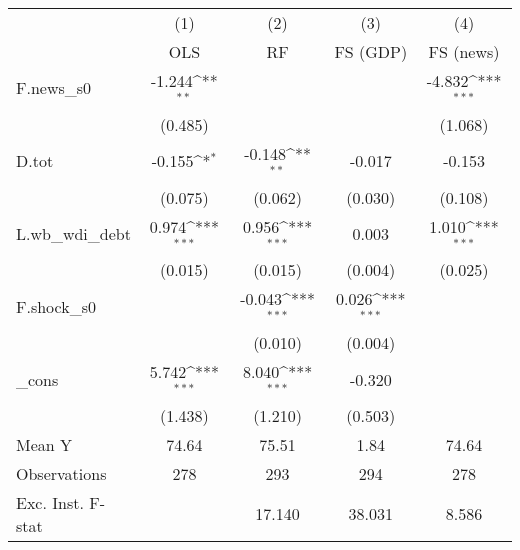 {
\def\sym#1{\ifmmode^{#1}\else\(^{#1}\)\fi}
\begin{tabular}{l*{4}{c}}
\toprule
            &\multicolumn{1}{c}{(1)}&\multicolumn{1}{c}{(2)}&\multicolumn{1}{c}{(3)}&\multicolumn{1}{c}{(4)}\\
            &\multicolumn{1}{c}{OLS}&\multicolumn{1}{c}{RF}&\multicolumn{1}{c}{FS (GDP)}&\multicolumn{1}{c}{FS (news)}\\
\midrule
F.news\_s0   &      -1.244\sym{**} &                     &                     &      -4.832\sym{***}\\
            &     (0.485)         &                     &                     &     (1.068)         \\
\addlinespace
D.tot       &      -0.155\sym{*}  &      -0.148\sym{**} &      -0.017         &      -0.153         \\
            &     (0.075)         &     (0.062)         &     (0.030)         &     (0.108)         \\
\addlinespace
L.wb\_wdi\_debt&       0.974\sym{***}&       0.956\sym{***}&       0.003         &       1.010\sym{***}\\
            &     (0.015)         &     (0.015)         &     (0.004)         &     (0.025)         \\
\addlinespace
F.shock\_s0  &                     &      -0.043\sym{***}&       0.026\sym{***}&                     \\
            &                     &     (0.010)         &     (0.004)         &                     \\
\addlinespace
\_cons      &       5.742\sym{***}&       8.040\sym{***}&      -0.320         &                     \\
            &     (1.438)         &     (1.210)         &     (0.503)         &                     \\
\midrule
Mean Y      &       74.64         &       75.51         &        1.84         &       74.64         \\
Observations&         278         &         293         &         294         &         278         \\
Exc. Inst. F-stat&                     &      17.140         &      38.031         &       8.586         \\
\bottomrule
\end{tabular}
}
